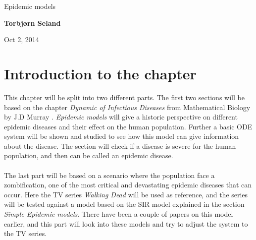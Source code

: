 \documentclass[%
twoside,                 %
final,                   %
10pt]{article}
\begin{document}






\thispagestyle{empty}

\begin{center}
{\LARGE\bf
\begin{spacing}{1.25}
Epidemic models
\end{spacing}
}
\end{center}


\begin{center}
{\bf Torbjørn Seland${}^{}$} \\ [0mm]
\end{center}

    \begin{center}
\end{center}


\begin{center}
Oct 2, 2014
\end{center}

\vspace{1cm}


\tableofcontents


\vspace{1cm} %



\newcommand{\Imax}{I_{\textrm{max}}}
\section{Introduction to the chapter}
This chapter will be split into two different parts. The first two sections will be based on the chapter \emph{Dynamic of Infectious Diseases} from Mathematical Biology by J.D Murray \cite{murray2002mathematical}. \emph{Epidemic models} will give a historic perspective on different epidemic diseases and their effect on the human population. Further a basic ODE system will be shown and studied to see how this model can give information about the disease. The section will check if a disease is severe for the human population, and then can be called an epidemic disease.
\\
\\
The last part will be based on a scenario where the population face a zombification, one of the most critical and devastating epidemic diseases that can occur. Here the TV series \emph{Walking Dead} will be used as reference, and the series will be tested against a model based on the SIR model explained in the section \emph{Simple Epidemic models}. There have been a couple of papers on this model earlier, and this part will look into these models and try to adjust the system to the TV series.     
\end{document}
